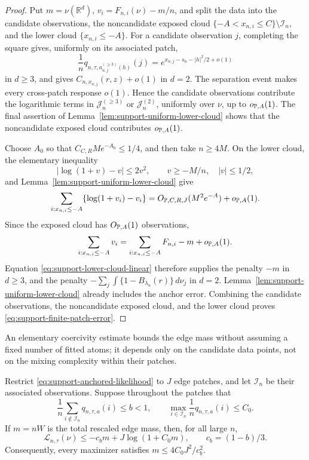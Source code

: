 \begin{proof}
Put \(m=\nu(\mathbb R^d)\), \(v_i=F_{n,i}(\nu)-m/n\), and split the data into
the candidate observations, the noncandidate exposed cloud
\(\{-A<x_{n,i}\le C\}\setminus\mathcal I_n\), and the lower cloud
\(\{x_{n,i}\le-A\}\).  For a candidate observation \(j\), completing the
square gives, uniformly on its associated patch,
\[
 \frac1nq_{n,\tau,a_{n,j}^{(\ge3)}(h)}(j)
 =e^{x_{n,j}-s_n-|h|^2/2+o(1)}
\]
in \(d\ge3\), and gives \(C_{n,x_{n,j}}(r,z)+o(1)\) in \(d=2\).
The separation event makes every cross-patch response \(o(1)\).  Hence the
candidate observations contribute the logarithmic terms in
\(\mathcal J_n^{(\ge3)}\) or \(\mathcal J_n^{(2)}\), uniformly over \(\nu\),
up to \(o_{\mathbb P,A}(1)\).  The final assertion of
Lemma~\ref{lem:support-uniform-lower-cloud} shows that the noncandidate exposed
cloud contributes \(o_{\mathbb P,A}(1)\).

Choose \(A_0\) so that \(C_{C,R}Me^{-A_0}\le1/4\), and then take
\(n\ge4M\).  On the lower cloud, the elementary inequality
\[
 |\log(1+v)-v|\le2v^2,
 \qquad v\ge-M/n,\quad |v|\le1/2,
\]
and Lemma~\ref{lem:support-uniform-lower-cloud} give
\[
 \sum_{i:x_{n,i}\le-A}\{\log(1+v_i)-v_i\}
 =O_{\mathbb P,C,R,J}(M^2e^{-A})+o_{\mathbb P,A}(1).
\]
Since the exposed cloud has \(O_{\mathbb P,A}(1)\) observations,
\[
 \sum_{i:x_{n,i}\le-A}v_i
 =\sum_{i:x_{n,i}\le-A}F_{n,i}-m+o_{\mathbb P,A}(1).
\]
Equation \eqref{eq:support-lower-cloud-linear} therefore supplies the penalty
\(-m\) in \(d\ge3\), and the penalty
\(-\sum_j\int\{1-B_{\lambda_n}(r)\}\,d\nu_j\) in \(d=2\).
Lemma~\ref{lem:support-uniform-lower-cloud} already includes the anchor error.
Combining the candidate observations, the noncandidate exposed cloud, and the
lower cloud proves \eqref{eq:support-finite-patch-error}.
\end{proof}

An elementary coercivity estimate bounds the edge mass without assuming a
fixed number of fitted atoms; it depends only on the candidate data points,
not on the mixing complexity within their patches.
\begin{proposition}
\label{prop:support-patch-coercivity}
Restrict \eqref{eq:support-anchored-likelihood} to \(J\) edge patches, and let
\(\mathcal I_n\) be their associated observations. Suppose throughout the
patches that
\[
 \frac1n\sum_{i\notin\mathcal I_n}q_{n,\tau,a}(i)\le b<1,
 \qquad
 \max_{i\in\mathcal I_n}\frac1nq_{n,\tau,a}(i)\le C_0.
\]
If \(m=nW\) is the total rescaled edge mass, then, for all large \(n\),
\[
    \mathcal L_{n,\tau}(\nu)
    \le-c_bm+J\log(1+C_0m),
    \qquad c_b=(1-b)/3.
\]
Consequently, every maximizer satisfies
\(m\le4C_0J^2/c_b^2\).
\end{proposition}

